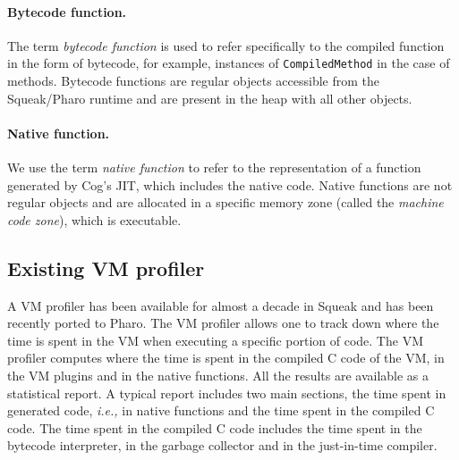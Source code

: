 \documentclass[10pt,preprint,nonatbib]{sigplanconf}
\newcommand{\ct}{\lstinline[backgroundcolor=\color{white},basicstyle=\small\ttfamily]}
\newcommand{\ie}{\emph{i.e.,}\xspace}
\begin{document}
\paragraph{Bytecode function.} The term \emph{bytecode function} is used to refer specifically to the compiled function in the form of bytecode, for example, instances of \ct{CompiledMethod} in the case of methods. Bytecode functions are regular objects accessible from the Squeak/Pharo runtime and are present in the heap with all other objects.

\paragraph{Native function.} We use the term \emph{native function} to refer to the representation of a function generated by Cog's JIT, which includes the native code. Native functions are not regular objects and are allocated in a specific memory zone (called the \emph{machine code zone}), which is executable.

\subsection{Existing VM profiler}

A VM profiler has been available for almost a decade in Squeak and has been recently ported to Pharo. The VM profiler allows one to track down where the time is spent in the VM when executing a specific portion of code. The VM profiler computes where the time is spent in the compiled C code of the VM, in the VM plugins and in the native functions. All the results are available as a statistical report. A typical report includes two main sections, the time spent in generated code, \ie in native functions and the time spent in the compiled C code. The time spent in the compiled C code includes the time spent in the bytecode interpreter, in the garbage collector and in the just-in-time compiler. 

\end{document}

